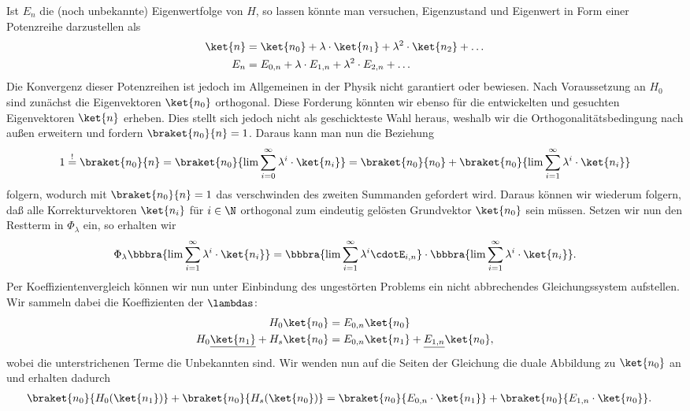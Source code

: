 \documentclass{subfile}
\begin{document}
            Ist $E_n$ die (noch unbekannte) Eigenwertfolge von $H$, so lassen könnte man versuchen, Eigenzustand und Eigenwert in Form einer Potenzreihe darzustellen als
            \begin{align*}
                \ket{n} &= \ket{n_0} + \lambda\cdot\ket{n_1} + \lambda^2\cdot\ket{n_2} + \dots \\
                E_n &= E_{0,n} + \lambda\cdot E_{1,n} + \lambda^2\cdot E_{2,n} + \dots
            \end{align*}
            Die Konvergenz dieser Potenzreihen ist jedoch im Allgemeinen in der Physik nicht garantiert oder bewiesen. Nach Voraussetzung an $H_0$ sind zunächst die Eigenvektoren $\ket{n_0}$ orthogonal. Diese Forderung könnten wir ebenso für die entwickelten und gesuchten Eigenvektoren $\ket{n}$ erheben. Dies stellt sich jedoch nicht als geschickteste Wahl heraus, weshalb wir die Orthogonalitätsbedingung nach außen erweitern und fordern $\braket{n_0}{n} = 1$. Daraus kann man nun die Beziehung
            \[
                1 \stackrel{!}{=} \braket{n_0}{n} = \braket{n_0}{\lim\sum_{i=0}^\infty \lambda^i\cdot\ket{n_i}} = \braket{n_0}{n_0} + \braket{n_0}{\lim\sum_{i=1}^\infty \lambda^i\cdot\ket{n_i}}
            \]
            folgern, wodurch mit $\braket{n_0}{n} = 1$ das verschwinden des zweiten Summanden gefordert wird. Daraus können wir wiederum folgern, daß alle Korrekturvektoren $\ket{n_i}$ für $i\in\N$ orthogonal zum eindeutig gelösten Grundvektor $\ket{n_0}$ sein müssen. Setzen wir nun den Restterm in $\Phi_\lambda$ ein, so erhalten wir 
            \[
                \Phi_\lambda\bbbra{\lim\sum_{i=1}^\infty \lambda^i\cdot\ket{n_i}} = \bbbra{\lim\sum_{i=1}^\infty\lambda^i\cdotE_{i,n}}\cdot\bbbra{\lim\sum_{i=1}^\infty \lambda^i\cdot\ket{n_i}}.
            \]
            Per Koeffizientenvergleich können wir nun unter Einbindung des ungestörten Problems ein nicht abbrechendes Gleichungssystem aufstellen. Wir sammeln dabei die Koeffizienten der $\lambdas$:
            \begin{align*}
                H_0\ket{n_0} &= E_{0,n}\ket{n_0} \\
                H_0\underline{\ket{n_1}} + H_s\ket{n_0} &= E_{0,n}\ket{n_1} + \underline{E_{1,n}}\ket{n_0},
            \end{align*}
            wobei die unterstrichenen Terme die Unbekannten sind. Wir wenden nun auf die Seiten der Gleichung die duale Abbildung zu $\ket{n_0}$ an und erhalten dadurch
            \begin{align*}
                \braket{n_0}{H_0(\ket{n_1})} + \braket{n_0}{H_s(\ket{n_0})} &= \braket{n_0}{E_{0,n}\cdot \ket{n_1}} + \braket{n_0}{E_{1,n}\cdot\ket{n_0}}.
            \end{align*}
\end{document}
